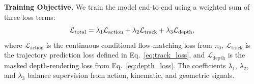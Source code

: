 \noindent
\textbf{Training Objective.}
%
We train the model end-to-end using a weighted sum of three loss terms:
\vspace{-5pt}
\begin{equation}
    \mathcal{L}_{\text{total}}
    = \lambda_{1}\mathcal{L}_{\text{action}}
    + \lambda_{2}\mathcal{L}_{\text{track}}
    + \lambda_{3}\mathcal{L}_{\text{depth}},
    \label{eq:total_loss}
    \vspace{-5pt}
\end{equation}
where $\mathcal{L}_{\text{action}}$ is the continuous conditional flow-matching loss from $\pi_0$, $\mathcal{L}_{\text{track}}$ is the trajectory prediction loss defined in Eq.~\ref{eq:track_loss}, and $\mathcal{L}_{\text{depth}}$ is the masked depth-rendering loss from Eq.~\ref{eq:depth_loss}. The coefficients $\lambda_{1}$, $\lambda_{2}$, and $\lambda_{3}$ balance supervision from action, kinematic, and geometric signals.




